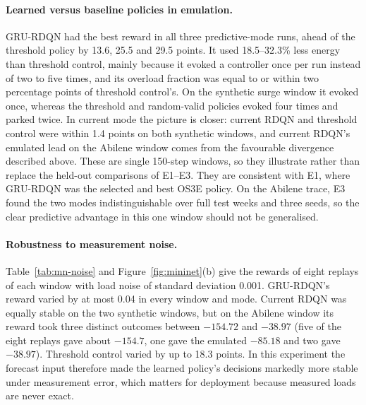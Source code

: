 \paragraph{Learned versus baseline policies in emulation.} GRU-RDQN had the best reward in all three predictive-mode runs, ahead of the threshold policy by 13.6, 25.5 and 29.5 points. It used 18.5--32.3\% less energy than threshold control, mainly because it evoked a controller once per run instead of two to five times, and its overload fraction was equal to or within two percentage points of threshold control's. On the synthetic surge window it evoked once, whereas the threshold and random-valid policies evoked four times and parked twice. In current mode the picture is closer: current RDQN and threshold control were within 1.4 points on both synthetic windows, and current RDQN's emulated lead on the Abilene window comes from the favourable divergence described above. These are single 150-step windows, so they illustrate rather than replace the held-out comparisons of E1--E3. They are consistent with E1, where GRU-RDQN was the selected and best OS3E policy. On the Abilene trace, E3 found the two modes indistinguishable over full test weeks and three seeds, so the clear predictive advantage in this one window should not be generalised.

\paragraph{Robustness to measurement noise.} Table~\ref{tab:mn-noise} and Figure~\ref{fig:mininet}(b) give the rewards of eight replays of each window with load noise of standard deviation 0.001. GRU-RDQN's reward varied by at most 0.04 in every window and mode. Current RDQN was equally stable on the two synthetic windows, but on the Abilene window its reward took three distinct outcomes between $-154.72$ and $-38.97$ (five of the eight replays gave about $-154.7$, one gave the emulated $-85.18$ and two gave $-38.97$). Threshold control varied by up to 18.3 points. In this experiment the forecast input therefore made the learned policy's decisions markedly more stable under measurement error, which matters for deployment because measured loads are never exact.

